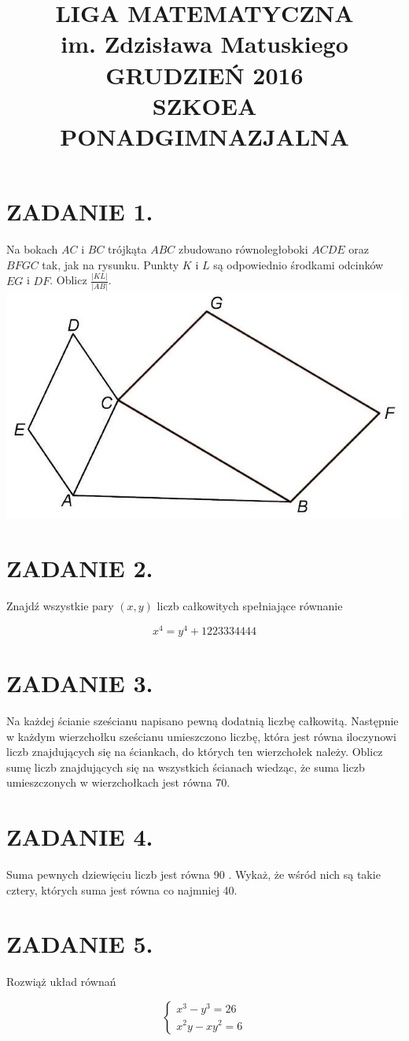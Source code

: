 \documentclass[10pt]{article}
\title{LIGA MATEMATYCZNA \\
 im. Zdzisława Matuskiego \\
 GRUDZIEŃ 2016 \\
 SZKOEA PONADGIMNAZJALNA }
\author{}
\date{}
\begin{document}
\maketitle
\section*{ZADANIE 1.}
Na bokach \(A C\) i \(B C\) trójkąta \(A B C\) zbudowano równoległoboki \(A C D E\) oraz \(B F G C\) tak, jak na rysunku. Punkty \(K\) i \(L\) są odpowiednio środkami odcinków \(E G\) i \(D F\). Oblicz \(\frac{|K L|}{|A B|}\).\\
\includegraphics[max width=\textwidth, center]{2024_11_21_e2a822c97454b65cf5e4g-1}

\section*{ZADANIE 2.}
Znajdź wszystkie pary \((x, y)\) liczb całkowitych spełniające równanie

\[
x^{4}=y^{4}+1223334444
\]

\section*{ZADANIE 3.}
Na każdej ścianie sześcianu napisano pewną dodatnią liczbę całkowitą. Następnie w każdym wierzchołku sześcianu umieszczono liczbę, która jest równa iloczynowi liczb znajdujących się na ściankach, do których ten wierzchołek należy. Oblicz sumę liczb znajdujących się na wszystkich ścianach wiedząc, że suma liczb umieszczonych w wierzchołkach jest równa 70.

\section*{ZADANIE 4.}
Suma pewnych dziewięciu liczb jest równa 90 . Wykaż, że wśród nich są takie cztery, których suma jest równa co najmniej 40.

\section*{ZADANIE 5.}
Rozwiąż układ równań

\[
\left\{\begin{array}{l}
x^{3}-y^{3}=26 \\
x^{2} y-x y^{2}=6
\end{array}\right.
\]
\end{document}
